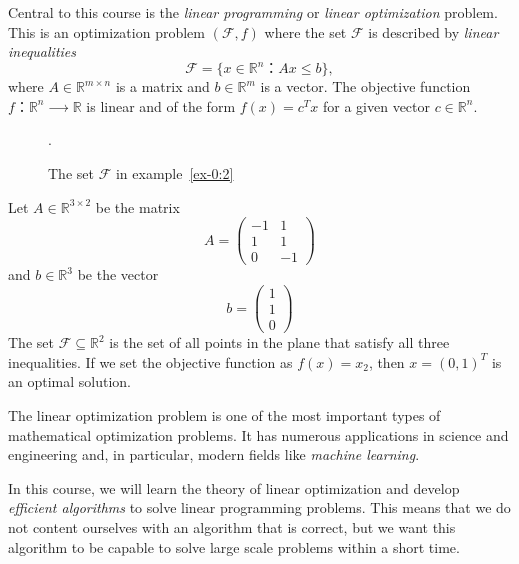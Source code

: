 \bigskip 

Central to this course is the \emph{linear programming} or \emph{linear optimization} problem.  This is an optimization problem $(ℱ,f)$  where the set $ℱ$ is described by \emph{linear inequalities}
\begin{displaymath}
  ℱ = \{ x ∈ ℝ^n ： Ax ≤ b\}, 
\end{displaymath}
where $A ∈ ℝ^{m ×n}$ is a matrix and $b ∈ ℝ^{m}$ is a vector. The objective function $f： ℝ^n ⟶ℝ$   is linear and of the form $f(x) = c^Tx$ for a given vector $c ∈ ℝ^n$.  


\begin{example}
  \label{ex-0:2}
    \begin{figure}
      \centering
        
      \caption{The set $ℱ$ in example~\ref{ex-0:2}}. 
      \label{fig:10}
    \end{figure}

  Let $A ∈ ℝ^{3 ×2}$ be the matrix
  \begin{displaymath}
    A =
    \begin{pmatrix}
      -1 & 1 \\
      1 & 1 \\
      0 & -1 
    \end{pmatrix}
  \end{displaymath}
  and $b ∈ ℝ^3$ be the vector
  \begin{displaymath}
    b =
    \begin{pmatrix}
      1 \\ 1 \\ 0
    \end{pmatrix}
  \end{displaymath}
  The set $ℱ ⊆ ℝ^2$ is the set of all points in the plane that satisfy all three inequalities. If we set the objective function as $f(x) = x_2$, then $x = (0,1)^T$ is an optimal solution.   
\end{example}
The linear optimization problem is one of the most important types of mathematical optimization problems. It has numerous applications in science and engineering and, in particular, modern fields like \emph{machine learning}.

In this course, we will learn  the theory of linear optimization and develop \emph{efficient algorithms} to solve linear programming problems. This means that we do not content ourselves with an algorithm that is correct, but we want this algorithm to be capable to solve large scale problems within a short time. 




